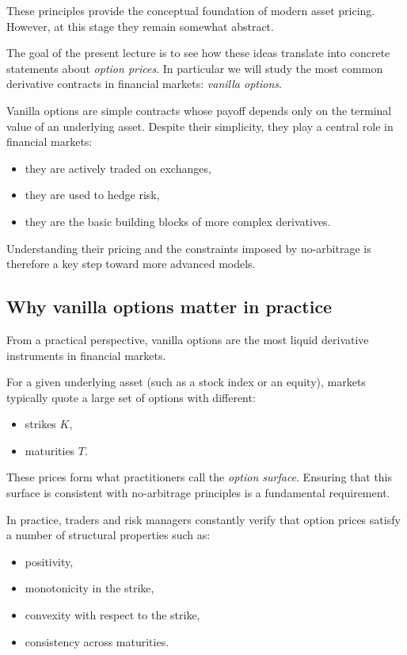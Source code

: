 \documentclass[11pt]{article}
\newcommand{\1}{\mathbf{1}}
\theoremstyle{plain}
\theoremstyle{definition}
\theoremstyle{remark}
\begin{document}
These principles provide the conceptual foundation of modern asset pricing.
However, at this stage they remain somewhat abstract.

The goal of the present lecture is to see how these ideas translate
into concrete statements about \emph{option prices}.
In particular we will study the most common derivative contracts
in financial markets: \emph{vanilla options}.

Vanilla options are simple contracts whose payoff depends only on the
terminal value of an underlying asset.
Despite their simplicity, they play a central role in financial markets:
\begin{itemize}[leftmargin=1.4em]
    \item they are actively traded on exchanges,
    \item they are used to hedge risk,
    \item they are the basic building blocks of more complex derivatives.
\end{itemize}

Understanding their pricing and the constraints imposed by no-arbitrage
is therefore a key step toward more advanced models.

\subsection{Why vanilla options matter in practice}

From a practical perspective, vanilla options are the most liquid
derivative instruments in financial markets.

For a given underlying asset (such as a stock index or an equity),
markets typically quote a large set of options with different:
\begin{itemize}[leftmargin=1.4em]
    \item strikes \(K\),
    \item maturities \(T\).
\end{itemize}

These prices form what practitioners call the
\emph{option surface}.
Ensuring that this surface is consistent with no-arbitrage principles
is a fundamental requirement.

In practice, traders and risk managers constantly verify that option prices satisfy a number of structural properties such as:
\begin{itemize}[leftmargin=1.4em]
    \item positivity,
    \item monotonicity in the strike,
    \item convexity with respect to the strike,
    \item consistency across maturities.
\end{itemize}
\end{document}
